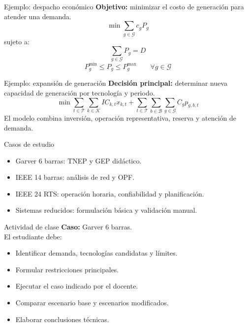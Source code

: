 \documentclass[aspectratio=169]{beamer}
\begin{document}
\begin{frame}{Ejemplo: despacho económico}
  \textbf{Objetivo:} minimizar el costo de generación para atender una demanda.
  \[
    \min \sum_{g\in \mathcal{G}} c_g P_g
  \]
  sujeto a:
  \[
    \sum_{g\in\mathcal{G}} P_g = D
  \]
  \[
    P_g^{\min} \leq P_g \leq P_g^{\max} \qquad \forall g\in\mathcal{G}
  \]
\end{frame}

\begin{frame}{Ejemplo: expansión de generación}
  \textbf{Decisión principal:} determinar nueva capacidad de generación por tecnología y periodo.
  \[
    \min \sum_{t\in\mathcal{T}} \sum_{k\in\mathcal{K}} IC_{k,t} x_{k,t}
    + \sum_{t\in\mathcal{T}} \sum_{b\in\mathcal{B}} \sum_{g\in\mathcal{G}} C_g p_{g,b,t}
  \]
  El modelo combina inversión, operación representativa, reserva y atención de demanda.
\end{frame}

\begin{frame}{Casos de estudio}
  \begin{itemize}
    \item Garver 6 barras: TNEP y GEP didáctico.
    \item IEEE 14 barras: análisis de red y OPF.
    \item IEEE 24 RTS: operación horaria, confiabilidad y planificación.
    \item Sistemas reducidos: formulación básica y validación manual.
  \end{itemize}
\end{frame}

\begin{frame}{Actividad de clase}
  \textbf{Caso:} Garver 6 barras.\\[0.5em]
  El estudiante debe:
  \begin{itemize}
    \item Identificar demanda, tecnologías candidatas y límites.
    \item Formular restricciones principales.
    \item Ejecutar el caso indicado por el docente.
    \item Comparar escenario base y escenarios modificados.
    \item Elaborar conclusiones técnicas.
  \end{itemize}
\end{frame}
\end{document}
